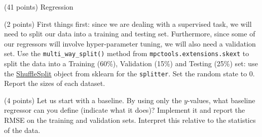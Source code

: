 \documentclass[12pt]{article}
\begin{document}
\begin{question}{\label{Q_LR_BA}(41 points) Regression}





\begin{subquestion}{(2 points) First things first: since we are dealing with a supervised task, we will need to split our data into a training and testing set. Furthermore, since some of our regressors will involve hyper-parameter tuning, we will also need a validation set. Use the \texttt{multi\_way\_split()} method from \texttt{mpctools.extensions.skext} to split the data into a Training (60\%), Validation (15\%) and Testing (25\%) set: use the \href{https://scikit-learn.org/stable/modules/generated/sklearn.model_selection.ShuffleSplit.html}{ShuffleSplit} object from sklearn for the \texttt{splitter}. Set the random state to 0.  Report the sizes of each dataset.}






\end{subquestion}

\begin{subquestion}{(4 points) Let us start with a baseline. By using only the $y$-values, what baseline regressor can you define (indicate what it does)? Implement it and report the RMSE on the training and validation sets. Interpret this relative to the statistics of the data.}







\end{subquestion}
\end{question}
\end{document}
